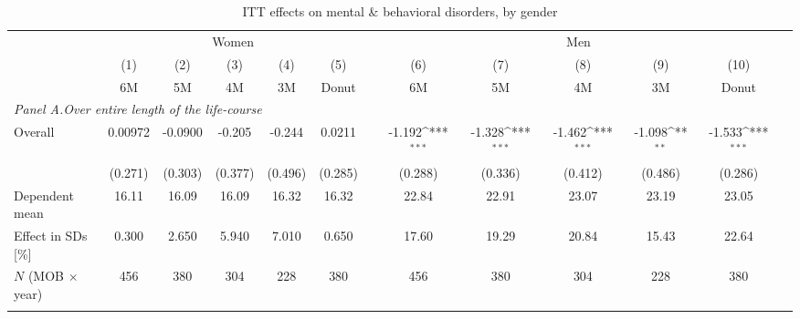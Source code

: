 \begin{landscape}
\vspace*{\fill}
 \begin{table}[H] \centering 
 	\begin{threeparttable} \centering \caption{ITT effects on mental \& behavioral disorders, by gender}\label{tab_mlch: DD_d5_female_male} {\def\sym#1{\ifmmode^{#1}\else\(^{#1}\)\fi} 
 			\begin{tabular}{l*{12}{c}}
 				\toprule 
 				& \multicolumn{5}{c}{Women} && \multicolumn{5}{c}{Men} \\ 
 				\cmidrule(lr){2-6} \cmidrule(lr){8-12}
 				&\multicolumn{1}{c}{(1)}&\multicolumn{1}{c}{(2)}&\multicolumn{1}{c}{(3)}&\multicolumn{1}{c}{(4)}&\multicolumn{1}{c}{(5)}&\multicolumn{1}{c}{        }&\multicolumn{1}{c}{(6)}&\multicolumn{1}{c}{(7)}&\multicolumn{1}{c}{(8)}&\multicolumn{1}{c}{(9)}&\multicolumn{1}{c}{(10)}\\
 				&\multicolumn{1}{c}{6M}&\multicolumn{1}{c}{5M}&\multicolumn{1}{c}{4M}&\multicolumn{1}{c}{3M}&\multicolumn{1}{c}{Donut}&&\multicolumn{1}{c}{6M}&\multicolumn{1}{c}{5M}&\multicolumn{1}{c}{4M}&\multicolumn{1}{c}{3M}&\multicolumn{1}{c}{Donut}\\
 				\midrule
 				\multicolumn{5}{l}{\emph{Panel A.Over entire length of the life-course}} \\


 				\hspace*{10pt}Overall&     0.00972         &     -0.0900         &      -0.205         &      -0.244         &      0.0211       & &      -1.192\sym{***}&      -1.328\sym{***}&      -1.462\sym{***}&      -1.098\sym{**} &      -1.533\sym{***}\\
				                    &     (0.271)         &     (0.303)         &     (0.377)         &     (0.496)         &     (0.285)        & &     (0.288)         &     (0.336)         &     (0.412)         &     (0.486)         &     (0.286)         \\
				\midrule Dependent mean&       16.11         &       16.09         &       16.09         &       16.32         &       16.32     & &       22.84         &       22.91         &       23.07         &       23.19         &       23.05         \\
				Effect in SDs [\%]  &       0.300         &       2.650         &       5.940         &       7.010         &       0.650        & &       17.60         &       19.29         &       20.84         &       15.43         &       22.64         \\
				\(N\) (MOB $\times$ year)&         456         &         380         &         304         &         228         &         380   & &         456         &         380         &         304         &         228         &         380         \\
				\\


\end{tabular}}
\end{threeparttable}
\end{table}
\end{landscape}
